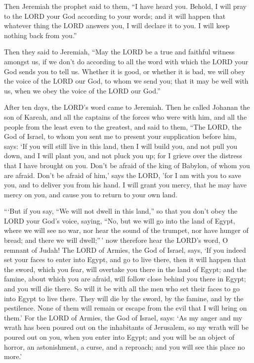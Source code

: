  Then Jeremiah the prophet said to them, ``I have heard you.
Behold, I will pray to the LORD your God according to your words; and it
will happen that whatever thing the LORD answers you, I will declare it
to you. I will keep nothing back from you.''

 Then they said to Jeremiah, ``May the LORD be a true and
faithful witness amongst us, if we don't do according to all the word
with which the LORD your God sends you to tell us.  Whether
it is good, or whether it is bad, we will obey the voice of the LORD our
God, to whom we send you; that it may be well with us, when we obey the
voice of the LORD our God.''

 After ten days, the LORD's word came to Jeremiah.
 Then he called Johanan the son of Kareah, and all the
captains of the forces who were with him, and all the people from the
least even to the greatest,  and said to them, ``The LORD,
the God of Israel, to whom you sent me to present your supplication
before him, says:  `If you will still live in this land,
then I will build you, and not pull you down, and I will plant you, and
not pluck you up; for I grieve over the distress that I have brought on
you.  Don't be afraid of the king of Babylon, of whom you
are afraid. Don't be afraid of him,' says the LORD, 'for I am with you
to save you, and to deliver you from his hand.  I will
grant you mercy, that he may have mercy on you, and cause you to return
to your own land.

 ```But if you say, ``We will not dwell in this land,'' so
that you don't obey the LORD your God's voice,  saying,
``No, but we will go into the land of Egypt, where we will see no war,
nor hear the sound of the trumpet, nor have hunger of bread; and there
we will dwell;''\,'  now therefore hear the LORD's word, O
remnant of Judah! The LORD of Armies, the God of Israel, says, `If you
indeed set your faces to enter into Egypt, and go to live there,
 then it will happen that the sword, which you fear, will
overtake you there in the land of Egypt; and the famine, about which you
are afraid, will follow close behind you there in Egypt; and you will
die there.  So will it be with all the men who set their
faces to go into Egypt to live there. They will die by the sword, by the
famine, and by the pestilence. None of them will remain or escape from
the evil that I will bring on them.'  For the LORD of
Armies, the God of Israel, says: `As my anger and my wrath has been
poured out on the inhabitants of Jerusalem, so my wrath will be poured
out on you, when you enter into Egypt; and you will be an object of
horror, an astonishment, a curse, and a reproach; and you will see this
place no more.'

